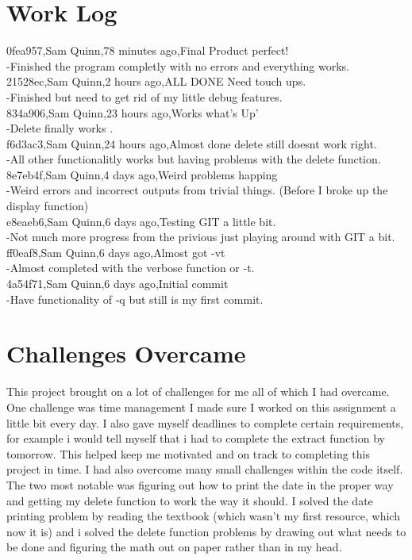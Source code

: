 \documentclass[letterpaper,10pt,notitlepage,fleqn]{article}
\begin{document}
\section*{Work Log}
0fea957,Sam Quinn,78 minutes ago,Final Product perfect!\\
-Finished the program completly with no errors and everything works.\\
21528ec,Sam Quinn,2 hours ago,ALL DONE Need touch ups.\\
-Finished but need to get rid of my little debug features.\\
834a906,Sam Quinn,23 hours ago,Works what's Up'\\
-Delete finally works .\\
f6d3ac3,Sam Quinn,24 hours ago,Almost done delete still doesnt work right.\\
-All other functionalitly works but having problems with the delete function.\\
8e7eb4f,Sam Quinn,4 days ago,Weird problems happing\\
-Weird errors and incorrect outputs from trivial things. (Before I broke up the display function)\\
e8eaeb6,Sam Quinn,6 days ago,Testing GIT a little bit.\\
-Not much more progress from the privious just playing around with GIT a bit.\\
ff0eaf8,Sam Quinn,6 days ago,Almost got -vt\\
-Almost completed with the verbose function or -t.\\
4a54f71,Sam Quinn,6 days ago,Initial commit\\
-Have functionality of -q but still is my first commit.


\section*{Challenges Overcame}
This project brought on a lot of challenges for me all of which I had overcame. One challenge was time management I made sure I worked on this assignment a little bit every day. I also gave myself deadlines to complete certain  requirements, for example i would tell myself that i had to complete the extract function by tomorrow. This helped keep me motivated and on track to completing this project in time. I had also overcome many small challenges within the code itself. The two most notable was figuring out how to print the date in the proper way and getting my delete function to work the way it should. I solved the date printing problem by reading the textbook (which wasn't my first resource, which now it is) and i solved the delete function problems by drawing out what needs to be done and figuring the math out on paper rather than in my head.
\end{document}
